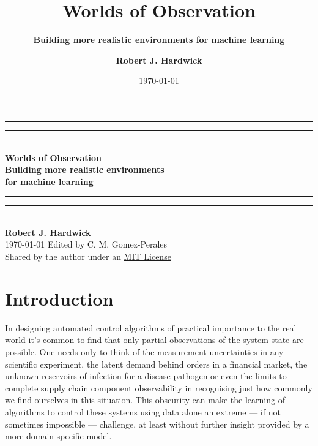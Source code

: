 \documentclass{book}
\title{\Huge \bfseries\sffamily Worlds of Observation}
\subtitle{\Large \bfseries\sffamily \color{gray75} Building more realistic environments for machine learning}
\author{\bfseries\sffamily Robert J. Hardwick}
\date{\today}
\begin{document}
\begin{titlepage}
\centering
\vspace*{1.5\baselineskip}
{\color{gray75}\rule{13cm}{1.3pt}}\vspace*{-\baselineskip}\vspace*{2pt} %
{\color{gray75}\rule{13cm}{0.4pt}} \\ %
\vspace{1.2\baselineskip} %
{\Huge \bfseries\sffamily Worlds of Observation} \\ 
\vspace{4mm}
{\Large \bfseries\sffamily \color{gray75} Building more realistic environments\\ for machine learning \\}
\vspace*{0.75\baselineskip}
{\color{gray75}\rule{13cm}{0.4pt}}\vspace*{-\baselineskip}\vspace*{2.75pt} %
{\color{gray75}\rule{13cm}{1.3pt}} \\ %
\vspace{1.0\baselineskip} %
{\large \bfseries\sffamily Robert J. Hardwick \\
\vspace*{1.2\baselineskip}}
\today
\vfill
Edited by C. M. Gomez-Perales \\ \vspace{1mm}
Shared by the author under an \href{https://opensource.org/licenses/MIT}{MIT License}
\end{titlepage}

\chapter*{Introduction}

In designing automated control algorithms of practical importance to the real world it's common to find that only partial observations of the system state are possible. One needs only to think of the measurement uncertainties in any scientific experiment, the latent demand behind orders in a financial market, the unknown reservoirs of infection for a disease pathogen or even the limits to complete supply chain component observability in recognising just how commonly we find ourselves in this situation. This obscurity can make the learning of algorithms to control these systems using data alone an extreme --- if not sometimes impossible --- challenge, at least without further insight provided by a more domain-specific model.
\end{document}
